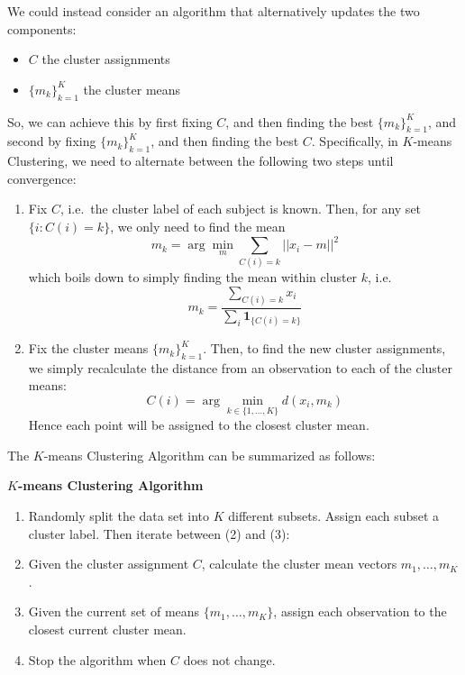 \documentclass[
]{book}
\begin{document}
We could instead consider an algorithm that alternatively updates the two components:

\begin{itemize}
\item
  \(C\) the cluster assignments
\item
  \(\{m_k\}_{k=1}^{K}\) the cluster means
\end{itemize}

So, we can achieve this by first fixing \(C\), and then finding the best \(\{m_k\}_{k=1}^{K}\), and
second by fixing \(\{m_k\}_{k=1}^{K}\), and then finding the best \(C\). Specifically, in
\(K\)-means Clustering, we need to alternate between the following two steps until convergence:

\begin{enumerate}
\def\labelenumi{\arabic{enumi}.}
\item
  Fix \(C\), i.e.~the cluster label of each subject is known. Then, for any set
  \(\{i : C(i) = k\}\), we only need to find the mean
  \[m_k = \arg \min_m \sum_{C(i)=k} ||x_i-m||^2\]
  which boils down to simply finding the mean within cluster \(k\), i.e.
  \[m_k = \frac{\sum_{C(i)=k} x_i}{\sum_i \mathbf{1}_{\{C(i)=k\}}} \]
\item
  Fix the cluster means \(\{m_k\}_{k=1}^{K}\). Then, to find the new cluster
  assignments, we simply recalculate the distance from an observation to each of the cluster means:
  \[C(i) = \arg \min_{k\in \{1, \ldots, K\}} d(x_i, m_k) \]
  Hence each point will be assigned to the closest cluster mean.
\end{enumerate}

The \(K\)-means Clustering Algorithm can be summarized as follows:

\textbf{\(K\)-means Clustering Algorithm}

\begin{enumerate}
\def\labelenumi{\arabic{enumi}.}
\item
  Randomly split the data set into \(K\) different subsets. Assign each subset a cluster label. Then iterate between (2) and (3):
\item
  Given the cluster assignment \(C\), calculate the cluster mean vectors \(m_1, \ldots, m_K\).
\item
  Given the current set of means \(\{m_1, \ldots, m_K\}\), assign each observation to the closest current cluster mean.
\item
  Stop the algorithm when \(C\) does not change.
\end{enumerate}
\end{document}
